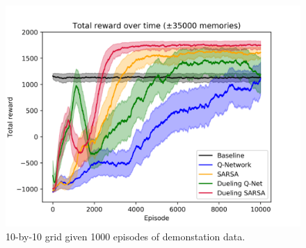 \begin{figure}[H]
    \includegraphics[width=\linewidth]{img/results/10-sized/total_rewards_1000m-min.png}
    \caption{10-by-10 grid given 1000 episodes of demonstation data.}
    \label{fig:10sized-1000mem}
\end{figure}
\hspace{1cm} %
